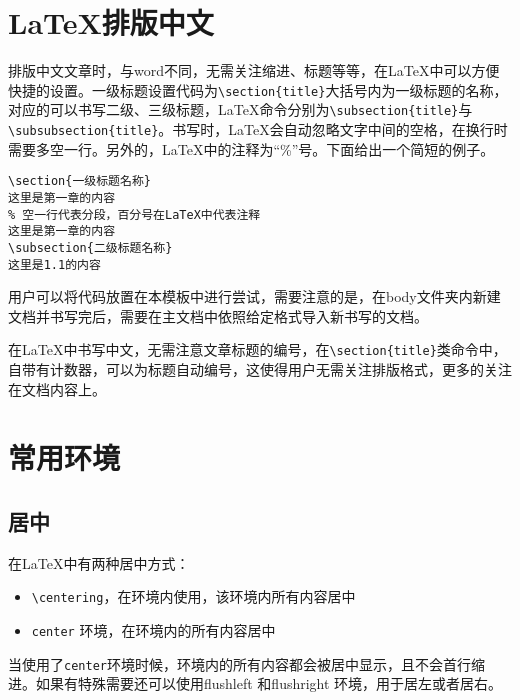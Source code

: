 \section{\LaTeX 排版中文}
排版中文文章时，与word不同，无需关注缩进、标题等等，在\LaTeX 中可以方便快捷的设置。一级标题设置代码为\verb|\section{title}|大括号内为一级标题的名称，对应的可以书写二级、三级标题，\LaTeX 命令分别为\verb|\subsection{title}|与\verb|\subsubsection{title}|。书写时，\LaTeX 会自动忽略文字中间的空格，在换行时需要多空一行。另外的，\LaTeX 中的注释为“\%”号。下面给出一个简短的例子。
\begin{verbatim}
\section{一级标题名称}
这里是第一章的内容
% 空一行代表分段，百分号在LaTeX中代表注释
这里是第一章的内容
\subsection{二级标题名称}
这里是1.1的内容
\end{verbatim}

用户可以将代码放置在本模板中进行尝试，需要注意的是，在body文件夹内新建文档并书写完后，需要在主文档中依照给定格式导入新书写的文档。

在\LaTeX 中书写中文，无需注意文章标题的编号，在\verb|\section{title}|类命令中，自带有计数器，可以为标题自动编号，这使得用户无需关注排版格式，更多的关注在文档内容上。
\section{常用环境}
\subsection{居中}
在\LaTeX 中有两种居中方式：
\begin{itemize}
\item \verb|\centering|，在环境内使用，该环境内所有内容居中
\item \verb|center| 环境，在环境内的所有内容居中
\end{itemize}
\begin{center}
当使用了\verb|center|环境时候，环境内的所有内容都会被居中显示，且不会首行缩进。如果有特殊需要还可以使用flushleft 和flushright 环境，用于居左或者居右。
\end{center}
